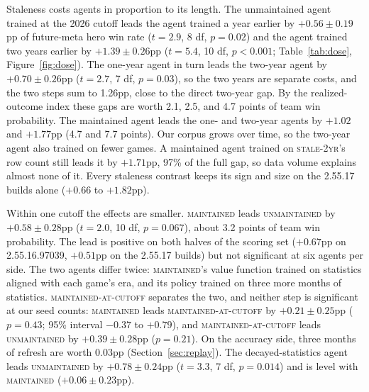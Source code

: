 \documentclass[journal]{IEEEtran}
\newcommand{\maintained}{\textsc{maintained}}          %
\newcommand{\mcut}{\textsc{maintained-at-cutoff}}      %
\newcommand{\stalefour}{\textsc{unmaintained}}          %
\newcommand{\staletwo}{\textsc{stale-2yr}}
\begin{document}
Staleness costs agents in proportion to its length. The unmaintained
agent trained at the 2026 cutoff leads the agent trained a year earlier
by $+0.56 \pm 0.19$pp of future-meta hero win rate ($t = 2.9$, 8 df,
$p = 0.02$) and the agent trained two years earlier by $+1.39 \pm
0.26$pp ($t = 5.4$, 10 df, $p < 0.001$; Table~\ref{tab:dose},
Figure~\ref{fig:dose}). The one-year agent in turn leads the two-year
agent by $+0.70 \pm 0.26$pp ($t = 2.7$, 7 df, $p = 0.03$), so the two
years are separate costs, and the two steps sum to 1.26pp, close to the
direct two-year gap. By the realized-outcome index these gaps are worth
2.1, 2.5, and 4.7 points of team win probability. The maintained agent
leads the one- and two-year agents by $+1.02$ and $+1.77$pp (4.7 and
7.7 points). Our corpus grows over time, so the two-year agent also
trained on fewer games. A maintained agent trained on \staletwo{}'s row
count still leads it by $+1.71$pp, 97\% of the full gap, so data volume
explains almost none of it. Every staleness contrast keeps its sign and
size on the 2.55.17 builds alone ($+0.66$ to $+1.82$pp).

Within one cutoff the effects are smaller. \maintained{} leads
\stalefour{} by $+0.58 \pm 0.28$pp ($t = 2.0$, 10 df, $p = 0.067$),
about 3.2 points of team win probability. The lead is positive on both
halves of the scoring set ($+0.67$pp on 2.55.16.97039, $+0.51$pp on the
2.55.17 builds) but not significant at six agents per side. The two
agents differ twice: \maintained{}'s value function trained on
statistics aligned with each game's era, and its policy trained on three
more months of statistics. \mcut{} separates the two, and neither step
is significant at our seed counts: \maintained{} leads \mcut{} by
$+0.21 \pm 0.25$pp ($p = 0.43$; 95\% interval $-0.37$ to $+0.79$), and
\mcut{} leads \stalefour{} by $+0.39 \pm 0.28$pp ($p = 0.21$). On the
accuracy side, three months of refresh are worth 0.03pp
(Section~\ref{sec:replay}). The decayed-statistics agent leads
\stalefour{} by $+0.78 \pm 0.24$pp ($t = 3.3$, 7 df, $p = 0.014$) and is
level with \maintained{} ($+0.06 \pm 0.23$pp).
\end{document}
